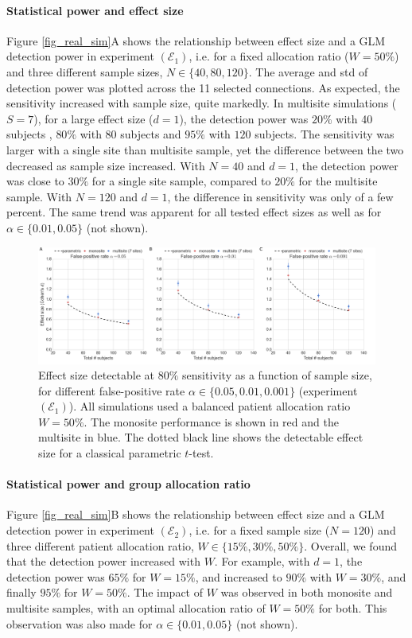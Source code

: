 \documentclass[authoryear]{elsarticle}
\begin{document}
\paragraph{Statistical power and effect size} Figure \ref{fig_real_sim}A shows the relationship between effect size and a GLM detection power in experiment $(\mathcal{E}_1)$, i.e. for a fixed allocation ratio ($W=50\%$) and three different sample sizes, $N\in\{40, 80, 120\}$. The average and std of detection power was plotted across the 11 selected connections. As expected, the sensitivity increased with sample size, quite markedly. In multisite simulations ($S=7$), for a large effect size ($d=1$), the detection power was $20\%$ with 40 subjects , $80\%$ with 80 subjects and $95\%$ with $120$ subjects. The sensitivity was larger with a single site than multisite sample, yet the difference between the two decreased as sample size increased. With $N=40$ and $d=1$, the detection power was close to $30\%$ for a single site sample, compared to $20\%$ for the multisite sample. With $N=120$ and $d=1$, the difference in sensitivity was only of a few percent. The same trend was apparent for all tested effect sizes as well as for $\alpha\in\{0.01,0.05\}$ (not shown).  
\par
\begin{figure}[htbp]\centering
\includegraphics[width=\textwidth]{../figures/samplesize_x_effectsize.png}
\caption[]{
Effect size detectable at $80\%$ sensitivity as a function of sample size, for different false-positive rate $\alpha\in \{0.05,0.01,0.001\}$ (experiment $(\mathcal{E}_1)$). All simulations used a balanced patient allocation ratio $W=50\%$. The monosite performance is shown in red and the multisite in blue. The dotted black line shows the detectable effect size for a classical parametric $t$-test. 
}
\label{fig_sampeffect_curves_alpha001}
\end{figure}

\paragraph{Statistical power and group allocation ratio} Figure \ref{fig_real_sim}B shows the relationship between effect size and a GLM detection power in experiment $(\mathcal{E}_2)$, i.e. for a fixed sample size ($N=120$) and three different patient allocation ratio, $W\in \{15\%, 30\%,50\%\}$. Overall, we found that the detection power increased with $W$. For example, with $d=1$, the detection power was $65\%$ for $W=15\%$, and increased to $90\%$ with $W=30\%$, and finally $95\%$ for $W=50\%$. The impact of $W$ was observed in both monosite and multisite samples, with an optimal allocation ratio of $W=50\%$ for both. This observation was also made for $\alpha\in\{0.01,0.05\}$ (not shown). 
\end{document}
